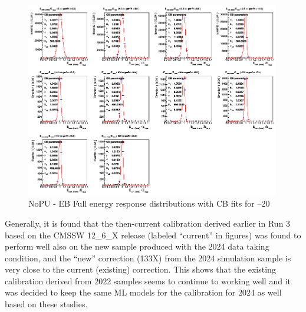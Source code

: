\begin{figure}[t!]
\centering
\includegraphics[width=0.99\textwidth]{./plots_pdf/ECAL_plots/plotsNoPU/EB/FULL/png/EBFULL_GENPT_0005_0020_PerBinFitEcor91formula}
\caption[Energy response distributions with CB fits for PF ECAL cluster calibrated using 2024 conditions]{NoPU - EB Full energy response distributions with CB fits for --20 \GeV}
\label{fig:Response_distrubution}
\end{figure}












Generally, it is found that the then-current calibration derived earlier in Run 3 based on the CMSSW 12\_6\_X release (labeled ``current'' in figures) was found to perform well also on the new sample produced with the 2024 data taking condition,
and the ``new'' correction (133X) from the 2024 simulation sample is very close to the current (existing) correction.
This shows that the existing calibration derived from 2022 samples seems to continue to working well and it was decided to keep the same ML models for the calibration for 2024 as well based on these studies.

